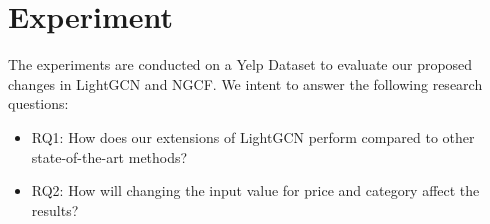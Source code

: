 \section{Experiment}
The experiments are conducted on a Yelp Dataset to evaluate our proposed changes in LightGCN and NGCF.
We intent to answer the following research questions:
\begin{itemize}
    \item RQ1: How does our extensions of LightGCN perform compared to other state-of-the-art methods?
    \item RQ2: How will changing the input value for price and category affect the results?
\end{itemize}



